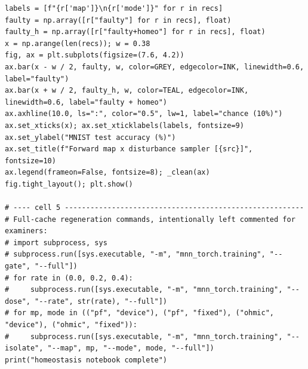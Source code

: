 \begin{lstlisting}[caption={experiments/homeostasis.ipynb},label={lst:mnn-nb-homeostasis}]
labels = [f"{r['map']}\n{r['mode']}" for r in recs]
faulty = np.array([r["faulty"] for r in recs], float)
faulty_h = np.array([r["faulty+homeo"] for r in recs], float)
x = np.arange(len(recs)); w = 0.38
fig, ax = plt.subplots(figsize=(7.6, 4.2))
ax.bar(x - w / 2, faulty, w, color=GREY, edgecolor=INK, linewidth=0.6, label="faulty")
ax.bar(x + w / 2, faulty_h, w, color=TEAL, edgecolor=INK, linewidth=0.6, label="faulty + homeo")
ax.axhline(10.0, ls=":", color="0.5", lw=1, label="chance (10%)")
ax.set_xticks(x); ax.set_xticklabels(labels, fontsize=9)
ax.set_ylabel("MNIST test accuracy (%)")
ax.set_title(f"Forward map x disturbance sampler [{src}]", fontsize=10)
ax.legend(frameon=False, fontsize=8); _clean(ax)
fig.tight_layout(); plt.show()

# ---- cell 5 --------------------------------------------------------
# Full-cache regeneration commands, intentionally left commented for examiners:
# import subprocess, sys
# subprocess.run([sys.executable, "-m", "mnn_torch.training", "--gate", "--full"])
# for rate in (0.0, 0.2, 0.4):
#     subprocess.run([sys.executable, "-m", "mnn_torch.training", "--dose", "--rate", str(rate), "--full"])
# for mp, mode in (("pf", "device"), ("pf", "fixed"), ("ohmic", "device"), ("ohmic", "fixed")):
#     subprocess.run([sys.executable, "-m", "mnn_torch.training", "--isolate", "--map", mp, "--mode", mode, "--full"])
print("homeostasis notebook complete")
\end{lstlisting}

